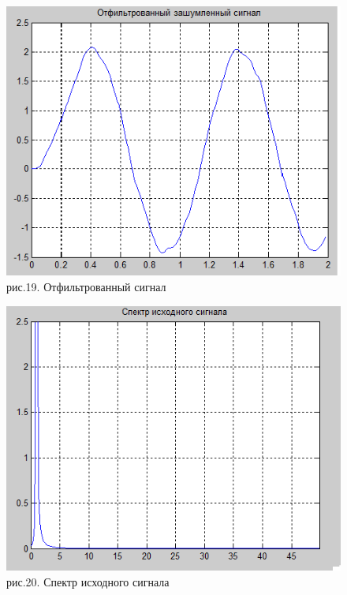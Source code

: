 \documentclass[10pt,a4paper]{report}
\begin{document}
\begin{figure}
\begin{center}
\includegraphics[angle=0, scale = 0.8]{6_3.png}\newline
рис.19. Отфильтрованный сигнал\newline
\end{center}
\end{figure}
\begin{figure}
\begin{center}
\includegraphics[angle=0, scale = 0.8]{6_4.png}\newline
рис.20. Спектр исходного сигнала\newline
\end{center}
\end{figure}
\end{document}
